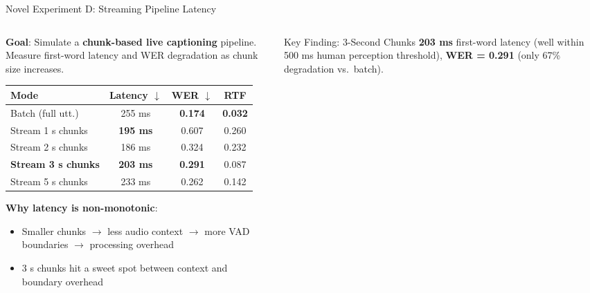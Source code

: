 \documentclass[aspectratio=169]{beamer}
\begin{document}
\begin{frame}{Novel Experiment D: Streaming Pipeline Latency}
  \begin{columns}[T]
    \begin{column}{0.52\textwidth}
      \textbf{Goal}: Simulate a \textbf{chunk-based live captioning} pipeline. Measure first-word latency and WER degradation as chunk size increases.

      \vspace{0.3cm}
      \begin{center}
        \begin{tabular}{@{}lccc@{}}
          \toprule
          \textbf{Mode} & \textbf{Latency} $\downarrow$ & \textbf{WER} $\downarrow$ & \textbf{RTF} \\
          \midrule
          Batch (full utt.) & 255 ms & \textbf{0.174} & \textbf{0.032} \\
          Stream 1 s chunks & \textbf{195 ms} & 0.607 & 0.260 \\
          Stream 2 s chunks & 186 ms & 0.324 & 0.232 \\
          \rowcolor{lightgray}
          \textbf{Stream 3 s chunks} & \textbf{203 ms} & \textbf{0.291} & 0.087 \\
          Stream 5 s chunks & 233 ms & 0.262 & 0.142 \\
          \bottomrule
        \end{tabular}
      \end{center}

      \vspace{0.2cm}
      \textbf{Why latency is non-monotonic}:
      \begin{itemize}
        \item Smaller chunks $\to$ less audio context $\to$ more VAD boundaries $\to$ processing overhead
        \item 3 s chunks hit a sweet spot between context and boundary overhead
      \end{itemize}
    \end{column}
    \begin{column}{0.45\textwidth}
      \begin{block}{Key Finding: 3-Second Chunks}
        \textbf{203 ms} first-word latency (well within 500 ms human perception threshold), \textbf{WER = 0.291} (only 67\% degradation vs.\ batch).


\end{block}
\end{column}
\end{columns}
\end{frame}
\end{document}
